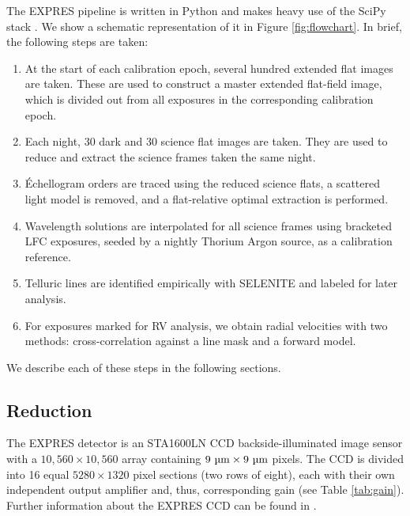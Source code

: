 The EXPRES pipeline is written in Python and makes heavy use of the SciPy stack \citep{virtanen_scipy_2020}. We show a schematic representation of it in Figure \ref{fig:flowchart}. In brief, the following steps are taken:

\begin{enumerate}
\item At the start of each calibration epoch, several hundred extended flat images are taken. These are used to construct a master extended flat-field image, which is divided out from all exposures in the corresponding calibration epoch.
\item Each night, 30 dark and 30 science flat images are taken. They are used to reduce and extract the science frames taken the same night.
\item \'Echellogram orders are traced using the reduced science flats, a scattered light model is removed, and a flat-relative optimal extraction is performed. 
\item Wavelength solutions are interpolated for all science frames using bracketed LFC exposures, seeded by a nightly Thorium Argon source, as a calibration reference.
\item Telluric lines are identified empirically with SELENITE \citep{leet_toward_2019} and labeled for later analysis.
\item For exposures marked for RV analysis, we obtain radial velocities with two methods: cross-correlation against a line mask and a forward model.
\end{enumerate}

We describe each of these steps in the following sections.

\subsection{Reduction}
\label{pipeline:reduction}

The EXPRES detector is an STA1600LN CCD backside-illuminated image sensor with a $10,560 \times 10,560$ array containing $9 ~\si{\micro\meter} \times 9 ~\si{\micro\meter}$ pixels. The CCD is divided into 16 equal $5280 \times 1320$ pixel sections (two rows of eight), each with their own independent output amplifier and, thus, corresponding gain (see Table \ref{tab:gain}). Further information about the EXPRES CCD can be found in \citet{blackman_performance_2020}.

